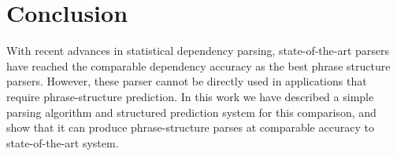 \documentclass[11pt,letterpaper]{article}
\newcommand{\RuleA}[3]{#1 \rightarrow #2^*\ #3}
\newcommand{\RuleB}[3]{#1 \rightarrow #2\ #3^*}
\begin{document}
\section{Conclusion}

With recent advances in statistical dependency parsing, state-of-the-art parsers
have reached the comparable  dependency accuracy as the best phrase structure parsers. However,
these parser cannot be directly used in applications that require phrase-structure prediction. In this work
we have described a simple parsing algorithm and structured prediction system for this comparison, and show that it
can produce phrase-structure parses at comparable accuracy to state-of-the-art system.











\end{document}
